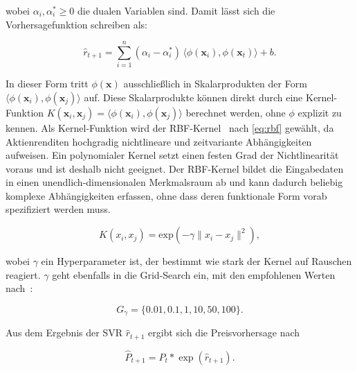 wobei $\alpha_i, \alpha_i^* \geq 0$ die dualen Variablen sind. Damit lässt sich die Vorhersagefunktion schreiben als:

\begin{equation}
    \hat{r}_{t+1} = \sum_{i=1}^{n} (\alpha_i - \alpha_i^*)\, \langle\phi(\mathbf{x}_i), \phi(\mathbf{x}_t)\rangle + b.
\end{equation}

In dieser Form tritt $\phi(\mathbf{x})$ ausschließlich in Skalarprodukten der Form $\langle\phi(\mathbf{x}_i), \phi(\mathbf{x}_j)\rangle$ auf. Diese Skalarprodukte können direkt durch eine Kernel-Funktion $K(\mathbf{x}_i, \mathbf{x}_j) = \langle\phi(\mathbf{x}_i), \phi(\mathbf{x}_j)\rangle$ berechnet werden, ohne $\phi$ explizit zu kennen.
Als Kernel-Funktion wird der \ac{RBF}-Kernel~\cite{Burges1998} nach \cref{eq:rbf} gewählt, da Aktienrenditen hochgradig nichtlineare und zeitvariante Abhängigkeiten aufweisen. Ein polynomialer Kernel setzt einen festen Grad der Nichtlinearität voraus und ist deshalb nicht geeignet. Der \ac{RBF}-Kernel bildet die Eingabedaten in einen unendlich-dimensionalen Merkmalsraum ab und kann dadurch beliebig komplexe Abhängigkeiten erfassen, ohne dass deren funktionale Form vorab spezifiziert werden muss.


\begin{equation}\label{eq:rbf}
    K(x_i, x_j) = \text{exp}(-\gamma\|x_i-x_j\|^2),
\end{equation}

wobei $\gamma$ ein Hyperparameter ist, der bestimmt wie stark der Kernel auf Rauschen reagiert. $\gamma$ geht ebenfalls in die Grid-Search ein, mit den empfohlenen Werten nach~\cite{hsu2003practical}:

\begin{equation*}
    G_\gamma = \{0.01, 0.1, 1, 10, 50, 100\}.
\end{equation*}

Aus dem Ergebnis der \ac{SVR} $\hat{r}_{t+1}$ ergibt sich die Preisvorhersage nach

\begin{equation}
    \hat{P}_{t+1} = P_t * \exp(\hat{r}_{t+1}).
\end{equation}